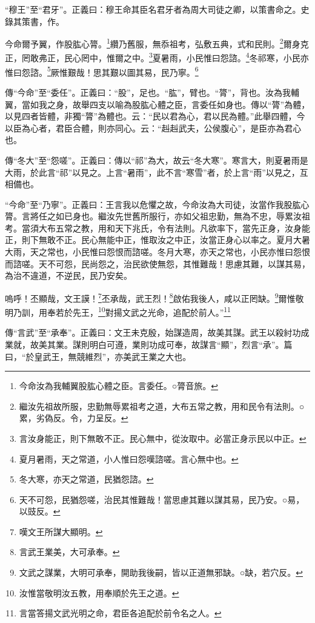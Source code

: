 {\noindent\shu{}\fzkt “穆王”至“君牙”。正義曰：穆王命其臣名君牙者為周大司徒之卿，以策書命之。史錄其策書，作。 \par}

今命爾予翼，作股肱心膂。\footnote{今命汝為我輔翼股肱心體之臣。言委任。○膂音旅。}纘乃舊服，無忝祖考，弘敷五典，式和民則。\footnote{繼汝先祖故所服，忠勤無辱累祖考之道，大布五常之教，用和民令有法則。○累，劣偽反。令，力呈反。}爾身克正，罔敢弗正，民心罔中，惟爾之中。\footnote{言汝身能正，則下無敢不正。民心無中，從汝取中。必當正身示民以中正。}夏暑雨，小民惟曰怨諮。\footnote{夏月暑雨，天之常道，小人惟曰怨嘆諮嗟。言心無中也。}冬祁寒，小民亦惟曰怨諮。\footnote{冬大寒，亦天之常道，民猶怨諮。}厥惟艱哉！思其艱以圖其易，民乃寧。\footnote{天不可怨，民猶怨嗟，治民其惟難哉！當思慮其難以謀其易，民乃安。○易，以豉反。}


{\noindent\zhuan{}\fzbyks 傳“今命”至“委任”。正義曰：“股”，足也。“肱”，臂也。“膂”，背也。汝為我輔翼，當如我之身，故舉四支以喻為股肱心體之臣，言委任如身也。傳以“膂”為體，以見四者皆體，非獨“膂”為體也。云：“民以君為心，君以民為體。”此舉四體，今以臣為心者，君臣合體，則亦同心。云：“赳赳武夫，公侯腹心”，是臣亦為君心也。 \par}

{\noindent\zhuan{}\fzbyks 傳“冬大”至“怨嗟”。正義曰：傳以“祁”為大，故云“冬大寒”。寒言大，則夏暑雨是大雨，於此言“祁”以見之。上言“暑雨”，此不言“寒雪”者，於上言“雨”以見之，互相備也。 \par}

{\noindent\shu{}\fzkt “今命”至“乃寧”。正義曰：王言我以危懼之故，今命汝為大司徒，汝當作我股肱心膂。言將任之如已身也。繼汝先世舊所服行，亦如父祖忠勤，無為不忠，辱累汝祖考。當須大布五常之教，用和天下兆氏，令有法則。凡欲率下，當先正身，汝身能正，則下無敢不正。民心無能中正，惟取汝之中正，汝當正身心以率之。夏月大暑大雨，天之常也，小民惟曰怨恨而諮嗟。冬月大寒，亦天之常也，小民亦惟曰怨恨而諮嗟。天不可怨，民尚怨之，治民欲使無怨，其惟難哉！思慮其難，以謀其易，為治不違道，不逆民，民乃安矣。 \par}

嗚呼！丕顯哉，文王謨！\footnote{嘆文王所謀大顯明。}丕承哉，武王烈！\footnote{言武王業美，大可承奉。}啟佑我後人，咸以正罔缺。\footnote{文武之謀業，大明可承奉，開助我後嗣，皆以正道無邪缺。○缺，若穴反。}爾惟敬明乃訓，用奉若於先王，\footnote{汝惟當敬明汝五教，用奉順於先王之道。}對揚文武之光命，追配於前人。”\footnote{言當答揚文武光明之命，君臣各追配於前令名之人。}


{\noindent\zhuan{}\fzbyks 傳“言武”至“承奉”。正義曰：文王未克殷，始謀造周，故美其謀。武王以殺紂功成業就，故美其業。謀則明白可遵，業則功成可奉，故謀言“顯”，烈言“承”。篇曰，“於皇武王，無競維烈”，亦美武王業之大也。 \par}

